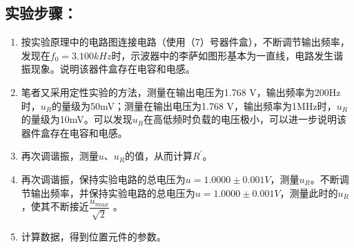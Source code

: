 \documentclass[a4paper,11pt]{article}
\begin{document}
\begin{appendix}
    \subsection{实验步骤：} 
    \begin{enumerate}
    	\item  按实验原理中的电路图连接电路（使用（7）号器件盒），不断调节输出频率，发现在$ f_{0} = 3.100 kHz $时，示波器中的李萨如图形基本为一直线，电路发生谐振现象。说明该器件盒存在电容和电感。
    	\item 笔者又采用定性实验的方法，测量在输出电压为1.768 V，输出频率为200Hz时，$u_{R}$的量级为50mV；测量在输出电压为1.768 V，输出频率为1MHz时，$u_{R}$的量级为10mV。可以发现$u_{R}$在高低频时负载的电压极小，可以进一步说明该器件盒存在电容和电感。
    	\item 再次调谐振，测量$u$、$u_{R}$的值，从而计算$R^{\prime}$。
    	\item 再次调谐振，保持实验电路的总电压为$u = 1.0000 \pm 0.001 V$，测量$u_{R}$。不断调节输出频率，并保持实验电路的总电压为$u = 1.0000 \pm 0.001 V$，测量此时的$u_{R}$，使其不断接近$\dfrac{u_{max}}{\sqrt{2}}$ 。
    	\item 计算数据，得到位置元件的参数。
    \end{enumerate}  

\end{appendix}
\end{document}
